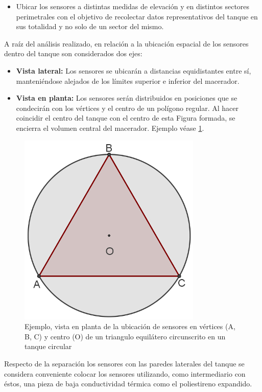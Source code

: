 \begin{itemize}
\begin{itemize}
            \item Ubicar los sensores a distintas medidas de elevación y en distintos sectores perimetrales con el objetivo de recolectar datos representativos del tanque en sus totalidad y no solo de un sector del mismo.
            
        \end{itemize}
       
        \par
        A raíz del análisis realizado, en relación a la ubicación espacial de los sensores dentro del tanque son considerados dos ejes:
        \begin{itemize}
            
            \item \textbf{Vista lateral: }Los sensores se ubicarán a distancias equidistantes entre sí, manteniéndose alejados de los límites superior e inferior del macerador.
            
            \item \textbf{Vista en planta: }Los sensores serán distribuidos en posiciones que se condecirán con los vértices y el centro de un polígono regular. Al hacer coincidir el centro del tanque con el centro de esta Figura formada, se encierra el volumen central del macerador. Ejemplo véase \ref{fig:PosSens}.
            
        \end{itemize}
        
        \begin{figure}            
        \centering
            \includegraphics[scale = 0.4]{hardware/posicionesSensores.jpg}
            \caption{Ejemplo, vista en planta de la ubicación de sensores en vértices (A, B, C) y centro (O) de un triangulo equilátero circunscrito en un tanque circular }
            \label{fig:PosSens}
        \end{figure}
        
        \par
        Respecto de la separación los sensores con las paredes laterales del tanque se considera conveniente colocar los sensores utilizando, como intermediario con éstos, una pieza de baja conductividad térmica como el poliestireno expandido.
        
    \end{itemize}

